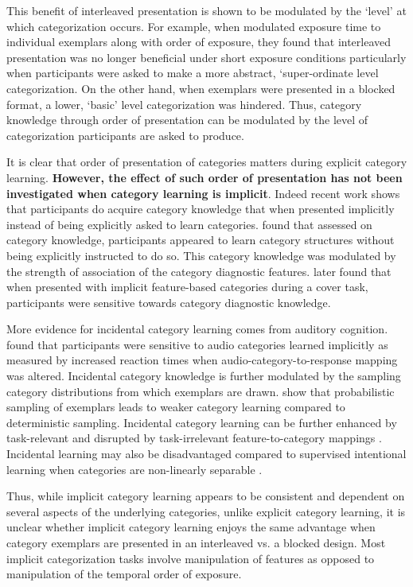 This benefit of interleaved presentation is shown to be modulated by the `level' at which categorization occurs. For example, when \cite{mack2015dynamics} modulated exposure time to individual exemplars along with order of exposure, they found that interleaved presentation was no longer beneficial under short exposure conditions particularly when participants were asked to make a more abstract, `super-ordinate level categorization. On the other hand, when exemplars were presented in a blocked format, a lower, `basic' level categorization was hindered. Thus, category knowledge through order of presentation can be modulated by the level of categorization participants are asked to produce.

It is clear that order of presentation of categories matters during explicit category learning. \textbf{However, the effect of such order of presentation has not been investigated when category learning is implicit}. Indeed recent work shows that participants do acquire category knowledge that when presented implicitly instead of being explicitly asked to learn categories. \cite{unger2022ready} found that assessed on category knowledge, participants appeared to learn category structures without being explicitly instructed to do so. This category knowledge was modulated by the strength of association of the category diagnostic features. \cite{unger2023without} later found that when presented with implicit feature-based categories during a cover task, participants were sensitive towards category diagnostic knowledge. 

More evidence for incidental category learning comes from auditory cognition. \cite{gabay2015incidental} found that participants were sensitive to audio categories learned implicitly as measured by increased reaction times when audio-category-to-response mapping was altered. Incidental category knowledge is further modulated by the sampling category distributions from which exemplars are drawn. \cite{roark2018task} show that probabilistic sampling of exemplars leads to weaker category learning compared to deterministic sampling. Incidental category learning can be further enhanced by task-relevant and disrupted by task-irrelevant feature-to-category mappings \cite{roark2022representational}. Incidental learning may also be disadvantaged compared to supervised intentional learning when categories are non-linearly separable \cite{love2002comparing}.

Thus, while implicit category learning appears to be consistent and dependent on several aspects of the underlying categories, unlike explicit category learning, it is unclear whether implicit category learning enjoys the same advantage when category exemplars are presented in an interleaved vs. a blocked design. Most implicit categorization tasks involve manipulation of features as opposed to manipulation of the temporal order of exposure. 

